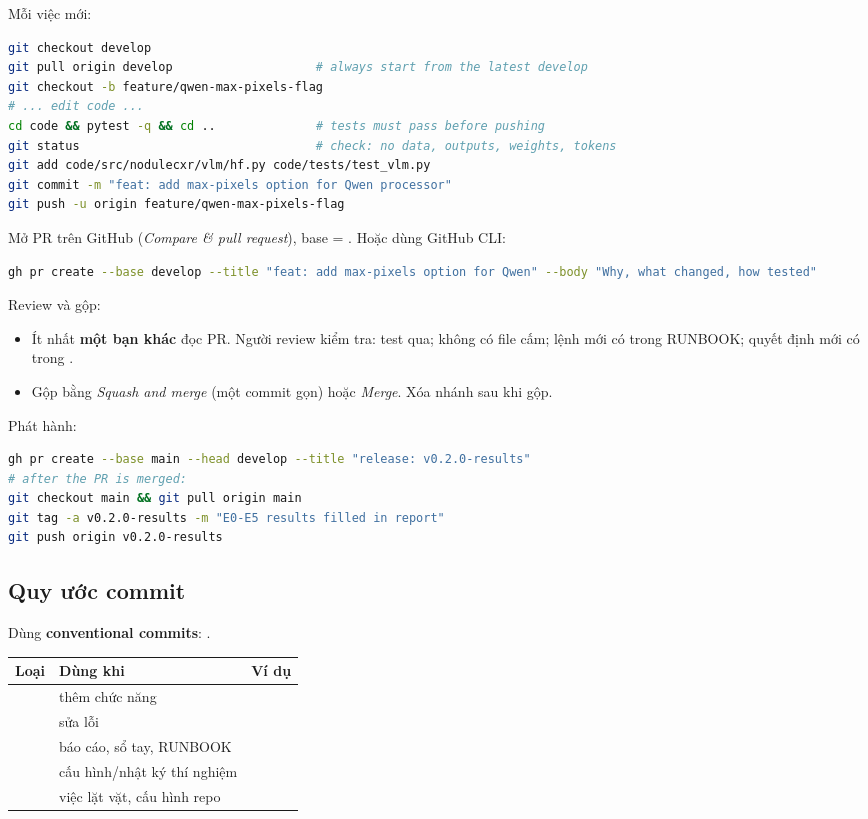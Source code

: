 Mỗi việc mới:
\begin{lstlisting}[language=bash]
git checkout develop
git pull origin develop                    # always start from the latest develop
git checkout -b feature/qwen-max-pixels-flag
# ... edit code ...
cd code && pytest -q && cd ..              # tests must pass before pushing
git status                                 # check: no data, outputs, weights, tokens
git add code/src/nodulecxr/vlm/hf.py code/tests/test_vlm.py
git commit -m "feat: add max-pixels option for Qwen processor"
git push -u origin feature/qwen-max-pixels-flag
\end{lstlisting}

Mở PR trên GitHub (\emph{Compare \& pull request}), base = . Hoặc dùng GitHub CLI:
\begin{lstlisting}[language=bash]
gh pr create --base develop --title "feat: add max-pixels option for Qwen" --body "Why, what changed, how tested"
\end{lstlisting}

Review và gộp:
\begin{itemize}
\item Ít nhất \textbf{một bạn khác} đọc PR. Người review kiểm tra: test qua; không có file cấm; lệnh mới có trong RUNBOOK; quyết định mới có trong .
\item Gộp bằng \emph{Squash and merge} (một commit gọn) hoặc \emph{Merge}. Xóa nhánh sau khi gộp.
\end{itemize}

Phát hành:
\begin{lstlisting}[language=bash]
gh pr create --base main --head develop --title "release: v0.2.0-results"
# after the PR is merged:
git checkout main && git pull origin main
git tag -a v0.2.0-results -m "E0-E5 results filled in report"
git push origin v0.2.0-results
\end{lstlisting}

\subsection{Quy ước commit}

Dùng \textbf{conventional commits}: .

\begin{center}
\small
\begin{tabularx}{\textwidth}{@{}l L l@{}}
\toprule
\textbf{Loại} & \textbf{Dùng khi} & \textbf{Ví dụ} \\
\midrule
{} & thêm chức năng &  \\
 & sửa lỗi &  \\
 & báo cáo, sổ tay, RUNBOOK &  \\
 & cấu hình/nhật ký thí nghiệm &  \\
 & việc lặt vặt, cấu hình repo &  \\
\bottomrule
\end{tabularx}
\end{center}

